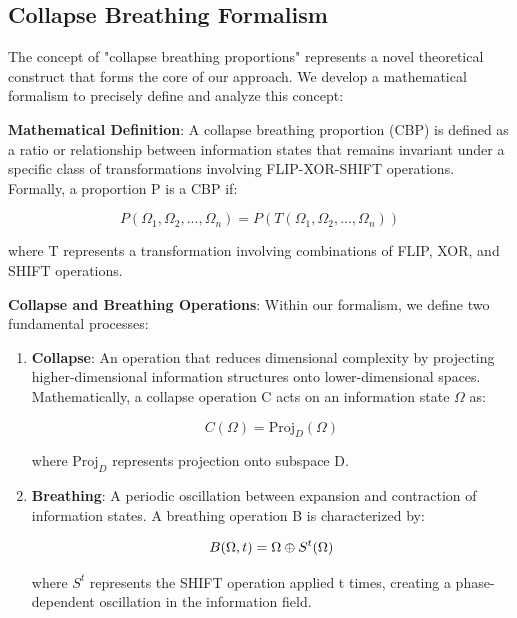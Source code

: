 \subsection{Collapse Breathing Formalism}

The concept of "collapse breathing proportions" represents a novel theoretical construct that forms the core of our approach. We develop a mathematical formalism to precisely define and analyze this concept:

\textbf{Mathematical Definition}: A collapse breathing proportion (CBP) is defined as a ratio or relationship between information states that remains invariant under a specific class of transformations involving FLIP-XOR-SHIFT operations. Formally, a proportion P is a CBP if:

\begin{equation}
P(\Omega_1, \Omega_2, ..., \Omega_n) = P(T(\Omega_1, \Omega_2, ..., \Omega_n))
\end{equation}

where T represents a transformation involving combinations of FLIP, XOR, and SHIFT operations.

\textbf{Collapse and Breathing Operations}: Within our formalism, we define two fundamental processes:

\begin{enumerate}
    \item \textbf{Collapse}: An operation that reduces dimensional complexity by projecting higher-dimensional information structures onto lower-dimensional spaces. Mathematically, a collapse operation C acts on an information state $\Omega$ as:
    
    \begin{equation}
    C(\Omega) = \text{Proj}_D(\Omega)
    \end{equation}
    
    where $\text{Proj}_D$ represents projection onto subspace D.
    
    \item \textbf{Breathing}: A periodic oscillation between expansion and contraction of information states. A breathing operation B is characterized by:
    
    \begin{equation}
    B(\Omega, t) = \Omega \oplus S^t(\Omega)
    \end{equation}
    
    where $S^t$ represents the SHIFT operation applied t times, creating a phase-dependent oscillation in the information field.
\end{enumerate}

